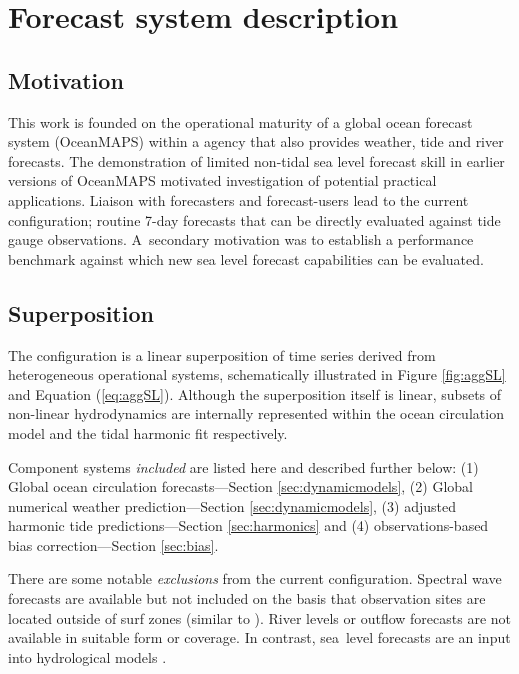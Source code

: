 \section{Forecast system description}
\subsection{Motivation}
This work is founded on the operational maturity of a global ocean forecast system (OceanMAPS) within a agency that also provides weather, tide and river forecasts.
The demonstration of limited non-tidal sea level forecast skill in earlier versions of OceanMAPS \citep{Taylor:2010ud} motivated investigation of potential practical applications. 
Liaison with forecasters and forecast-users lead to the current configuration; routine 7-day forecasts that can be directly evaluated against tide gauge observations.
A~secondary motivation was to establish a performance benchmark against which new sea level forecast capabilities can be evaluated. 

\subsection{Superposition}
\label{sec:concept}
The configuration is a linear superposition of time series derived from heterogeneous operational systems, schematically illustrated in Figure \ref{fig:aggSL} and Equation (\ref{eq:aggSL}).  
Although the superposition itself is linear, subsets of non-linear hydrodynamics are internally represented within the ocean circulation model  and the tidal harmonic fit respectively.

Component systems \textit{included} are listed here and described further below:
(1) Global ocean circulation forecasts---Section \ref{sec:dynamicmodels}, 
(2) Global numerical weather prediction---Section \ref{sec:dynamicmodels}, 
(3) adjusted harmonic tide predictions---Section \ref{sec:harmonics} and 
(4) observations-based bias correction---Section \ref{sec:bias}.

There are some notable \textit{exclusions} from the current configuration.
Spectral wave forecasts are available but not included on the basis that observation sites are located outside of surf zones (similar to  \citep{Tilburg:2004cg}).
River levels or outflow forecasts are not available in suitable form or coverage. In contrast, sea~level forecasts are an input into hydrological models \citep{Taylor:2011ud}.  

